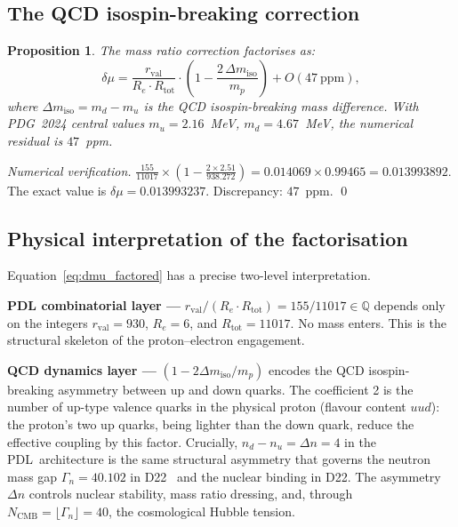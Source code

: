 \documentclass[11pt,a4paper]{article}
\newtheorem{proposition}[theorem]{Proposition}
\theoremstyle{definition}
\newcommand{\PDL}{\textnormal{PDL}}
\newcommand{\Rtot}{R_{\mathrm{tot}}}
\newcommand{\rval}{r_{\mathrm{val}}}
\newcommand{\dmu}{\delta\mu}
\newcommand{\dmiso}{\Delta m_{\mathrm{iso}}}
\begin{document}
\subsection{The QCD isospin-breaking correction}
\label{subsec:qcd}

\begin{proposition}
\label{prop:qcd_correction}
The mass ratio correction factorises as:
\begin{equation}
\label{eq:dmu_factored}
\dmu = \frac{\rval}{R_e\cdot\Rtot}\cdot\left(1 - \frac{2\,\dmiso}{m_p}\right) + O(47\ \mathrm{ppm}),
\end{equation}
where $\dmiso = m_d - m_u$ is the QCD isospin-breaking mass difference. With PDG~2024 central values $m_u = 2.16$~MeV, $m_d = 4.67$~MeV, the numerical residual is $47$~ppm.
\end{proposition}

\begin{proof}[Numerical verification]
$\frac{155}{11017}\times\!\left(1 - \frac{2\times2.51}{938.272}\right) = 0.014069\times0.99465 = 0.013993892$. The exact value is $\dmu = 0.013993237$. Discrepancy: $47$~ppm. \qed
\end{proof}

\subsection{Physical interpretation of the factorisation}
\label{subsec:interpretation}

Equation~\eqref{eq:dmu_factored} has a precise two-level interpretation.

\medskip\noindent\textbf{PDL combinatorial layer ---} $\rval/(R_e\cdot\Rtot) = 155/11017 \in \mathbb{Q}$ depends only on the integers $\rval = 930$, $R_e = 6$, and $\Rtot = 11017$. No mass enters. This is the structural skeleton of the proton--electron engagement.

\medskip\noindent\textbf{QCD dynamics layer ---} $(1-2\dmiso/m_p)$ encodes the QCD isospin-breaking asymmetry between up and down quarks. The coefficient 2 is the number of up-type valence quarks in the physical proton (flavour content $uud$): the proton's two up quarks, being lighter than the down quark, reduce the effective coupling by this factor. Crucially, $n_d - n_u = \Delta n = 4$ in the \PDL\ architecture is the same structural asymmetry that governs the neutron mass gap $\Gamma_n = 40.102$ in D22~\cite{Nuclear_Stability_PDL_2026} and the nuclear binding in D22. The asymmetry $\Delta n$ controls nuclear stability, mass ratio dressing, and, through $N_{\mathrm{CMB}} = \lfloor\Gamma_n\rfloor = 40$, the cosmological Hubble tension.
\end{document}
